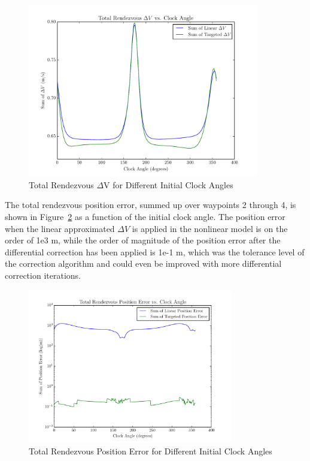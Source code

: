 \documentclass[letterpaper, preprint, paper,11pt]{AAS}	%
\begin{document}
\begin{figure}[htb] 
	\begin{center}
		\includegraphics[width=0.9\textwidth]{Total_DV_2_1degsteps} 
		\caption{Total Rendezvous \(\Delta\)V for Different Initial Clock Angles}
		\label{fig:DV_2}
	\end{center}
\end{figure}

The total rendezvous position error, summed up over waypoints 2 through 4, is shown in Figure~\ref{fig:PosErr_2} as a function of the initial clock angle.  The position error when the linear approximated \(\Delta V\) is applied in the nonlinear model is on the order of 1e3 m, while the order of magnitude of the position error after the differential correction has been applied is 1e-1 m, which was the tolerance level of the correction algorithm and could even be improved with more differential correction iterations.

\begin{figure}[htb] 
	\begin{center}
		\includegraphics[width=0.8\textwidth]{Log_Position_Error_2_1degsteps} 
		\caption{Total Rendezvous Position Error for Different Initial Clock Angles}
		\label{fig:PosErr_2}
	\end{center}
\end{figure}
\end{document}
